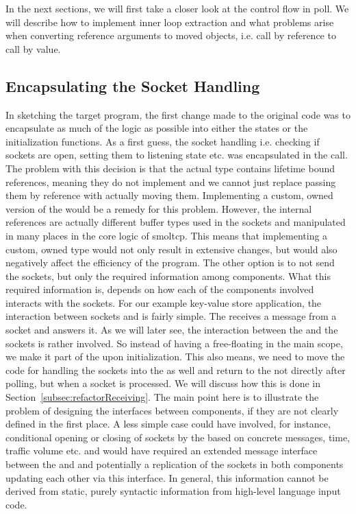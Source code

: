 In the next sections, we will first take a closer look at the control flow in poll. We will describe how to implement inner loop extraction and what problems arise when converting reference arguments to moved objects, i.e. call by reference to call by value.

\subsection{Encapsulating the Socket Handling}
\label{subsec:SocketHandling}
In sketching the target program, the first change made to the original code was to encapsulate as much of the logic as possible into either the states or the initialization functions. As a first guess, the socket handling i.e. checking if sockets are open, setting them to listening state etc. was encapsulated in the  call. The problem with this decision is that the actual  type contains lifetime bound references, meaning they do not implement  and we cannot just replace passing them by reference with actually moving them. Implementing a custom, owned version of the  would be a remedy for this problem. However, the internal references are actually different buffer types used in the sockets and manipulated in many places in the core logic of smoltcp. This means that implementing a custom, owned  type would not only result in extensive changes, but would also negatively affect the efficiency of the program. The other option is to not send the sockets, but only the required information among components. What this required information is, depends on how each of the components involved interacts with the sockets. For our example key-value store application, the interaction between sockets and \store{} is fairly simple. The \store{} receives a message from a socket and answers it. As we will later see, the interaction between the \stack{} and the sockets is rather involved. So instead of having a free-floating  in the main scope, we make it part of the \stack{} upon initialization. This also means, we need to move the code for handling the sockets into the \stack{} as well and return to the \store{} not directly after polling, but when a socket is processed. We will discuss how this is done in Section~\ref{subsec:refactorReceiving}. The main point here is to illustrate the problem of designing the interfaces between components, if they are not clearly defined in the first place. A less simple case could have involved, for instance, conditional opening or closing of sockets by the \store{} based on concrete messages, time, traffic volume etc. and would have required an extended message interface between the \stack{} and \store{} and potentially a replication of the sockets in both components updating each other via this interface. In general, this information cannot be derived from static, purely syntactic information from high-level language input code.

